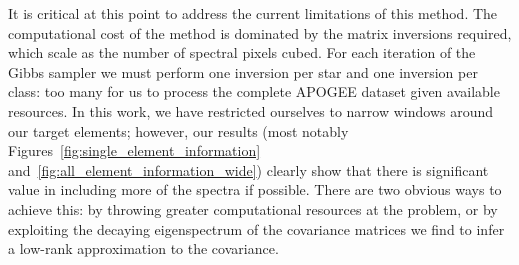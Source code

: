 \documentclass[a4paper,fleqn,usenatbib]{mnras}
\begin{document}

It is critical at this point to address the current limitations of this method. The computational cost of the method is dominated by the matrix inversions required, which scale as the number of spectral pixels cubed. For each iteration of the Gibbs sampler we must perform one inversion per star and one inversion per class: too many for us to process the complete APOGEE dataset given available resources. In this work, we have restricted ourselves to narrow windows around our target elements; however, our results (most notably Figures~\ref{fig:single_element_information} and~\ref{fig:all_element_information_wide}) clearly show that there is significant value in including more of the spectra if possible. There are two obvious ways to achieve this: by throwing greater computational resources at the problem, or by exploiting the decaying eigenspectrum of the covariance matrices we find to infer a low-rank approximation to the covariance.
\end{document}

